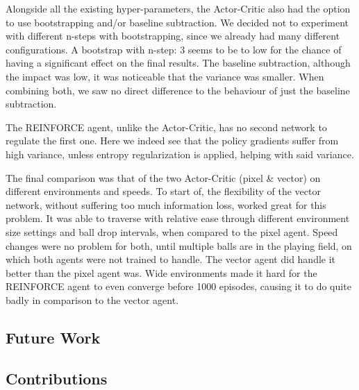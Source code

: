 \documentclass{article}
\begin{document}
Alongside all the existing hyper-parameters, the Actor-Critic also had the option to use bootstrapping and/or baseline subtraction. 
We decided not to experiment with different n-steps with bootstrapping, since we already had many different configurations. 
A bootstrap with n-step: 3 seems to be to low for the chance of having a significant effect on the final results. 
The baseline subtraction, although the impact was low, it was noticeable that the variance was smaller. 
When combining both, we saw no direct difference to the behaviour of just the baseline subtraction. 

The REINFORCE agent, unlike the Actor-Critic, has no second network to regulate the first one. 
Here we indeed see that the policy gradients suffer from high variance, unless entropy regularization is applied, helping with said variance. 

The final comparison was that of the two Actor-Critic (pixel \& vector) on different environments and speeds.
To start of, the flexibility of the vector network, without suffering too much information loss, worked great for this problem. 
It was able to traverse with relative ease through different environment size settings and ball drop intervals, when compared to the pixel agent.
Speed changes were no problem for both, until multiple balls are in the playing field, on which both agents were not trained to handle. 
The vector agent did handle it better than the pixel agent was. 
Wide environments made it hard for the REINFORCE agent to even converge before 1000 episodes, causing it to do quite badly in comparison to the vector agent. 


\subsection{Future Work}


\subsection{Contributions}
\label{C-Contributes}





\end{document}

